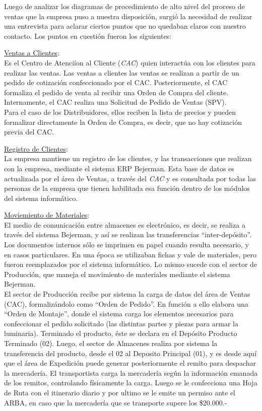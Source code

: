 Luego de analizar los diagramas de procedimiento de alto nivel del proceso de ventas que la empresa puso a nuestra disposici\'on, surgi\'o la necesidad de realizar una entrevista para aclarar ciertos puntos que no quedaban claros con nuestro contacto. Los puntos en cuesti\'on fueron los siguientes:

\begin{description}
 \item \underline{Ventas a Clientes}: \\
	Es el Centro de Atenci\'ion al Cliente (\textit{CAC}) quien interact\'ua con los clientes para realizar las ventas. Las ventas a clientes las ventas se realizan a partir de un pedido de cotizaci\'on confeccionado por el CAC. Posteriormente, el CAC formaliza el pedido de venta al recibir una Orden de Compra del cliente. Internamente, el CAC realiza una Solicitud de Pedido de Ventas (SPV).  \\
	Para el caso de los Distribuidores, ellos reciben la lista de precios y pueden formalizar directamente la Orden de Compra, es decir, que no hay cotizaci\'on previa del CAC.
 \item \underline{Registro de Clientes}: \\
	La empresa mantiene un registro de los clientes, y las transacciones que realizan con la empresa, mediante el sistema ERP Bejerman. Esta base de datos es actualizada por el \'area de Ventas, a trav\'es del \textit{CAC} y es consultada por todas las personas de la empresa que tienen habilitada esa funci\'on dentro de los m\'odulos del sistema inform\'atico. 
 \item \underline{Moviemiento de Materiales}: \\
	El medio de comunicaci\'on entre almacenes es electr\'onico, es decir, se realiza a trav\'es del sistema Bejerman, y as\'i se realizan las transferencias ``inter-dep\'osito''. Los documentos internos s\'olo se imprimen en papel cuando resulta necesario, y en casos particulares. En una \'epoca se utilizaban fichas y vale de materiales, pero fueron reemplazados por el sistema inform\'atico. Lo mismo sucede con el sector de Producci\'on, que maneja el movimiento de materiales mediante el sistema Bejerman.\\
	El sector de Producci\'on recibe por sistema la carga de datos del \'area de Ventas (CAC), formaliz\'andolo como ``Orden de Pedido''. En funci\'on a ello elabora una ``Orden de Montaje'', donde el sistema carga los elementos necesarios para confeccionar el pedido solicitado (las distintas partes y piezas para armar la luminaria). Terminado el producto, \'este se declara en el Dep\'osito Producto Terminado (02). Luego, el sector de Almacenes realiza por sistema la transferencia del producto, desde el 02 al Deposito Principal (01), y es desde aqu\'i que el \'area de Expedici\'on puede generar posteriormente el remito para despachar la mercader\'ia.  
	El transportista carga la mercader\'ia seg\'un la información emanada de los remitos, controlando f\'isicamente la carga.  Luego se le confecciona una Hoja de Ruta con el itinerario diario y por ultimo se le emite un permiso ante el ARBA, en caso que la mercader\'ia que se transporte supere los \$20.000.-   
	

\end{description}
